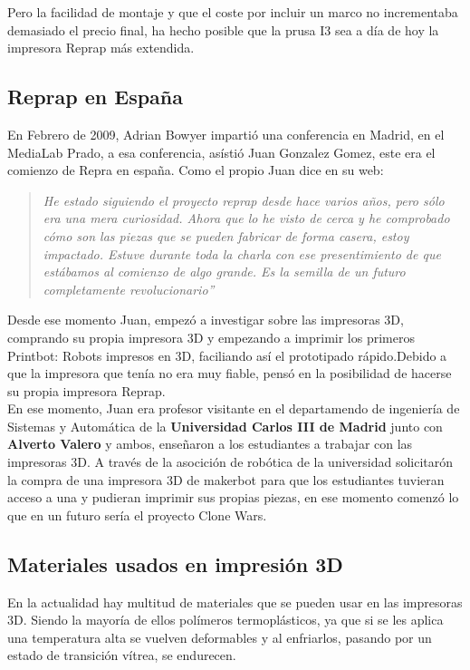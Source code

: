 Pero la facilidad de montaje y que el coste por incluir un marco no incrementaba demasiado el precio final, ha hecho posible que la prusa I3 sea a día de hoy la impresora Reprap más extendida.
\subsection{Reprap en España}

En Febrero de 2009, Adrian Bowyer impartió una conferencia en Madrid, en el MediaLab Prado, a esa conferencia, asístió Juan Gonzalez Gomez, este era el comienzo de Repra en españa. Como el propio Juan dice en su web\cite{juan1}:

\begin{quotation}
\emph{
He estado siguiendo el proyecto reprap desde hace varios años, pero sólo era una mera
curiosidad. Ahora que lo he visto de cerca y he comprobado cómo son las piezas que se
pueden fabricar de forma casera, estoy impactado. Estuve durante toda la charla con ese 
presentimiento de que estábamos al comienzo de algo grande. Es la semilla de un futuro
completamente revolucionario”}
\end{quotation}

Desde ese momento Juan, empezó a investigar sobre las impresoras 3D, comprando su propia impresora 3D\cite{juanR1} y empezando a imprimir los primeros Printbot: Robots impresos en 3D, faciliando así el prototipado rápido.Debido a que la impresora que tenía no era muy fiable, pensó en la posibilidad de hacerse su propia impresora Reprap.\\

En ese momento, Juan era profesor visitante en el departamendo de ingeniería de Sistemas y Automática de la \textbf{Universidad Carlos III de Madrid} junto con \textbf{Alverto Valero} y ambos, enseñaron a los estudiantes a trabajar con las impresoras 3D. A través de la asocición de robótica de la universidad solicitarón la compra de una impresora 3D de makerbot para que los estudiantes tuvieran acceso a una y pudieran imprimir sus propias piezas, en ese momento comenzó lo que en un futuro sería el proyecto Clone Wars.







\subsection{Materiales usados en impresión 3D}
\label{impreso_materiales}
En la actualidad hay multitud de materiales que se pueden usar en las impresoras 3D. Siendo la mayoría de ellos polímeros termoplásticos, ya que si se les aplica una temperatura alta se vuelven deformables y al enfriarlos, pasando por un estado de transición vítrea, se endurecen.\\

